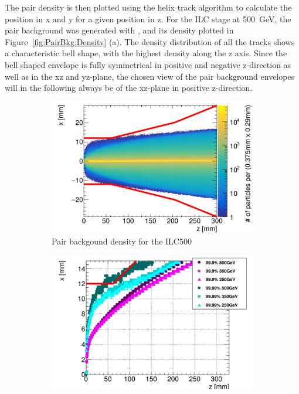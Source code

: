The pair density is then plotted using the helix track algorithm to calculate the position in x and y for a given position in z.
For the ILC stage at \SI{500}{\GeV}, the pair background was generated with \guineapig, and its density plotted in Figure~\ref{fig:PairBkg:Density} (a).
The density distribution of all the tracks shows a characteristic bell shape, with the highest density along the z axis.
Since the bell shaped envelope is fully symmetrical in positive and negative z-direction as well as in the xz and yz-plane, the chosen view of the pair background envelopes will in the following always be of the xz-plane in positive z-direction.
 \begin{figure}[!h]
 \centering
  \begin{subfigure}[b]{0.49\textwidth}
   \centering
    \includegraphics[width=\textwidth]{Figures/Pairs/Helix_tracks_xz_80bunches_500GeV_5T.png}
   \caption{Pair backgound density for the ILC500}
   \end{subfigure}
   \hfill
    \begin{subfigure}[b]{0.49\textwidth}
   \centering
    \includegraphics[width=\textwidth]{Figures/Pairs/HelixEnvelopes_COMPARISON_xz_500_350_250_comparison_EDITED_2.png}

\end{subfigure}
\end{figure}
